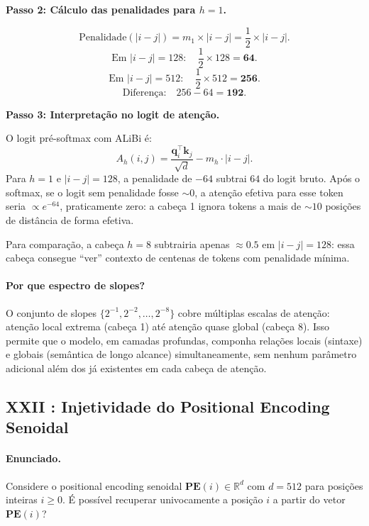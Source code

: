\documentclass{dlproblemset}
\begin{document}
\bigskip
\textbf{Passo 2: Cálculo das penalidades para $h = 1$.}

\[
  \text{Penalidade}(|i-j|) = m_1 \times |i-j| = \frac{1}{2} \times |i-j|.
\]
\[
  \text{Em } |i-j| = 128:\quad \frac{1}{2} \times 128 = \mathbf{64}.
\]
\[
  \text{Em } |i-j| = 512:\quad \frac{1}{2} \times 512 = \mathbf{256}.
\]
\[
  \text{Diferença:}\quad 256 - 64 = \mathbf{192}.
\]

\bigskip
\textbf{Passo 3: Interpretação no logit de atenção.}

O logit pré-softmax com ALiBi é:
\[
  A_h(i,j) = \frac{\mathbf{q}_i^\top \mathbf{k}_j}{\sqrt{d}} - m_h \cdot |i - j|.
\]
Para $h = 1$ e $|i-j| = 128$, a penalidade de $-64$ subtrai $64$ do logit bruto.
Após o softmax, se o logit sem penalidade fosse $\sim 0$, a atenção efetiva para esse
token seria $\propto e^{-64}$, praticamente zero: a cabeça 1 ignora tokens a mais de
$\sim\!10$ posições de distância de forma efetiva.

Para comparação, a cabeça $h = 8$ subtrairia apenas $\approx 0.5$ em $|i-j| = 128$:
essa cabeça consegue ``ver'' contexto de centenas de tokens com penalidade mínima.

\paragraph{Por que espectro de slopes?}
O conjunto de slopes $\{2^{-1}, 2^{-2}, \ldots, 2^{-8}\}$ cobre múltiplas escalas de
atenção: atenção local extrema (cabeça 1) até atenção quase global (cabeça 8). Isso
permite que o modelo, em camadas profundas, componha relações locais (sintaxe) e
globais (semântica de longo alcance) simultaneamente, sem nenhum parâmetro adicional
além dos já existentes em cada cabeça de atenção.

\subsection*{XXII {\mdseries{}}: Injetividade do Positional Encoding Senoidal}

\paragraph{Enunciado.}
Considere o positional encoding senoidal $\mathbf{PE}(i) \in \mathbb{R}^d$ com
$d = 512$ para posições inteiras $i \geq 0$. É possível recuperar univocamente a
posição $i$ a partir do vetor $\mathbf{PE}(i)$?
\end{document}
